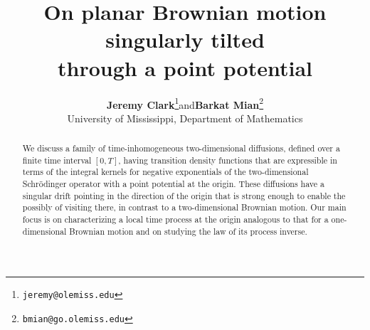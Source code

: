 \documentclass[10pt]{article}
\title{On planar Brownian motion singularly tilted \\ through a point potential}
\date{  }
\author{\textbf{Jeremy  Clark}\footnote{ {\tt jeremy@olemiss.edu}}\hspace{.8cm}and\hspace{.8cm}\textbf{Barkat Mian}\footnote{ {\tt bmian@go.olemiss.edu}} \vspace{.1cm}  \\  University of Mississippi, Department of Mathematics   }
\numberwithin{equation}{section}
\theoremstyle{definition}
\begin{document}
\maketitle



\begin{abstract} We discuss a family of time-inhomogeneous two-dimensional diffusions, defined over a finite time interval $[0,T]$,   having  transition density functions that are expressible in terms of the integral kernels for negative exponentials of the two-dimensional Schr\"odinger operator with a point potential at the origin.   These diffusions have a singular drift pointing in the direction of the origin that is strong enough to enable the possibly of visiting there, in contrast to a two-dimensional Brownian motion.   Our main focus is on  characterizing a local time process at the origin analogous to that for a one-dimensional Brownian motion and on studying the law of its process inverse.
\end{abstract}\vspace{.2cm}
\end{document}
